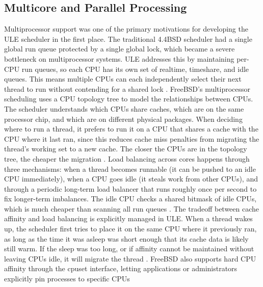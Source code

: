 \subsection{Multicore and Parallel Processing}
Multiprocessor support was one of the primary motivations for developing the ULE scheduler in the first place. The traditional 4.4BSD scheduler had a single global run queue protected by a single global lock, which became a severe bottleneck on multiprocessor systems. ULE addresses this by maintaining per-CPU run queues, so each CPU has its own set of realtime, timeshare, and idle queues. This means multiple CPUs can each independently select their next thread to run without contending for a shared lock \parencite{watson2015}.
FreeBSD's multiprocessor scheduling uses a CPU topology tree to model the relationships between CPUs. The scheduler understands which CPUs share caches, which are on the same processor chip, and which are on different physical packages. When deciding where to run a thread, it prefers to run it on a CPU that shares a cache with the CPU where it last ran, since this reduces cache miss penalties from migrating the thread's working set to a new cache. The closer the CPUs are in the topology tree, the cheaper the migration \parencite{watson2015}.
Load balancing across cores happens through three mechanisms: when a thread becomes runnable (it can be pushed to an idle CPU immediately), when a CPU goes idle (it steals work from other CPUs), and through a periodic long-term load balancer that runs roughly once per second to fix longer-term imbalances. The idle CPU checks a shared bitmask of idle CPUs, which is much cheaper than scanning all run queues \parencite{watson2015}.
The tradeoff between cache affinity and load balancing is explicitly managed in ULE. When a thread wakes up, the scheduler first tries to place it on the same CPU where it previously ran, as long as the time it was asleep was short enough that its cache data is likely still warm. If the sleep was too long, or if affinity cannot be maintained without leaving CPUs idle, it will migrate the thread \parencite{watson2015}. FreeBSD also supports hard CPU affinity through the cpuset interface, letting applications or administrators explicitly pin processes to specific CPUs

